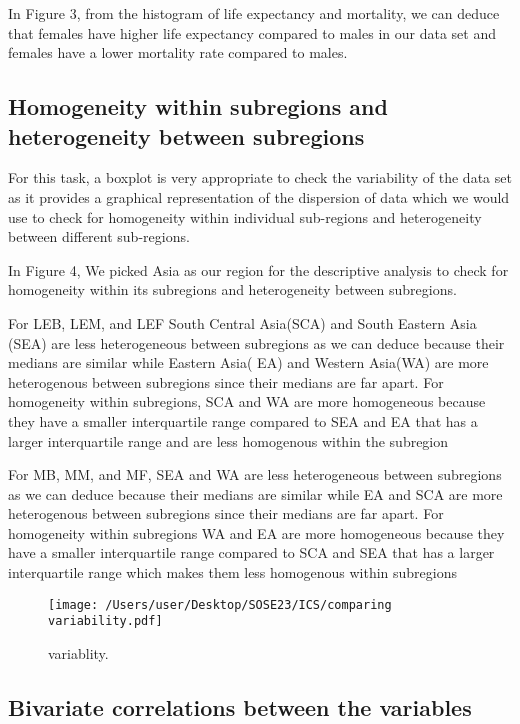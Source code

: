 \documentclass[12 pt]{scrartcl}
\begin{document}
In Figure 3, from the histogram of life expectancy and mortality, we can deduce that females have higher life expectancy compared to males in our data set and females have a lower mortality rate compared to males.

\subsection{Homogeneity within subregions and heterogeneity between subregions }
 For this task, a boxplot is very appropriate to check the variability of the data set as it provides a graphical representation of the dispersion of data which we would use to check for homogeneity within individual sub-regions and heterogeneity between different sub-regions.
 
 In Figure 4, We picked Asia as our region for the descriptive analysis to check for homogeneity within its subregions and heterogeneity between subregions.
 
 For LEB, LEM, and LEF South Central Asia(SCA) and South Eastern Asia (SEA) are less heterogeneous between subregions as we can deduce because their medians are similar while  Eastern Asia( EA) and Western Asia(WA) are more heterogenous between subregions since their medians are far apart. For homogeneity within subregions, SCA and WA are more homogeneous because they have a smaller interquartile range compared to SEA and EA that has a larger interquartile range and are less homogenous within the subregion
 
For MB, MM, and MF, SEA and WA are less heterogeneous between subregions as we can deduce because their medians are similar while  EA and SCA are more heterogenous between subregions since their medians are far apart. For homogeneity within subregions WA and EA are more homogeneous because they have a smaller interquartile range compared to SCA and SEA that has a larger interquartile range which makes them less homogenous within subregions

\begin{figure}[ht]
\centering
\texttt{[image: /Users/user/Desktop/SOSE23/ICS/comparing variability.pdf]}
\caption{variablity.}
\label{fig:boxplot}
\end{figure}

 
 
 
 
\subsection{Bivariate correlations between the variables }
\end{document}

